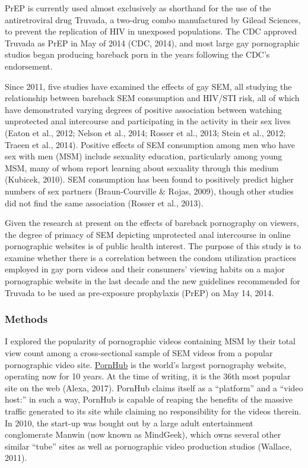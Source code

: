 \documentclass[]{article}
\begin{document}
PrEP is currently used almost exclusively as shorthand for the use of
the antiretroviral drug Truvada, a two-drug combo manufactured by Gilead
Sciences, to prevent the replication of HIV in unexposed populations.
The CDC approved Truvada as PrEP in May of 2014 (CDC, 2014), and most
large gay pornographic studios began producing bareback porn in the
years following the CDC's endorsement.

Since 2011, five studies have examined the effects of gay SEM, all
studying the relationship between bareback SEM consumption and HIV/STI
risk, all of which have demonstrated varying degrees of positive
association between watching unprotected anal intercourse and
participating in the activity in their sex lives (Eaton et al., 2012;
Nelson et al., 2014; Rosser et al., 2013; Stein et al., 2012; Traeen et
al., 2014). Positive effects of SEM consumption among men who have sex
with men (MSM) include sexuality education, particularly among young
MSM, many of whom report learning about sexuality through this medium
(Kubicek, 2010). SEM consumption has been found to positively predict
higher numbers of sex partners (Braun-Courville \& Rojas, 2009), though
other studies did not find the same association (Rosser et al., 2013).

Given the research at present on the effects of bareback pornography on
viewers, the degree of primacy of SEM depicting unprotected anal
intercourse in online pornographic websites is of public health
interest. The purpose of this study is to examine whether there is a
correlation between the condom utilization practices employed in gay
porn videos and their consumers' viewing habits on a major pornographic
website in the last decade and the new guidelines recommended for
Truvada to be used as pre-exposure prophylaxis (PrEP) on May 14, 2014.

\subsubsection{Methods}\label{methods}

I explored the popularity of pornographic videos containing MSM by their
total view count among a cross-sectional sample of SEM videos from a
popular pornographic video site. \href{www.pornhub.com}{PornHub} is the
world's largest pornography website, operating now for 10 years. At the
time of writing, it is the 36th most popular site on the web (Alexa,
2017). PornHub claims itself as a ``platform'' and a ``video host:'' in
such a way, PornHub is capable of reaping the benefits of the massive
traffic generated to its site while claiming no responsibility for the
videos therein. In 2010, the start-up was bought out by a large adult
entertainment conglomerate Manwin (now known as MindGeek), which owns
several other similar ``tube'' sites as well as pornographic video
production studios (Wallace, 2011).
\end{document}
